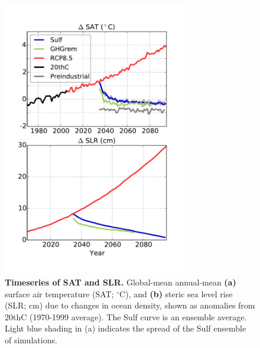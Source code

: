 \documentclass{nature}
\begin{document}
\begin{figure}%
\noindent\includegraphics[width=19pc]{figures/SAT_SLR_timeseries_geotimescalesWAISpaper.pdf} %
\caption{\textbf{Timeseries of SAT and SLR.} Global-mean annual-mean \textbf{(a)} surface air temperature (SAT; $^\circ$C), and \textbf{(b)} steric sea level rise (SLR; cm) due to changes in ocean density, shown as anomalies from 20thC (1970-1999 average). The Sulf curve is an ensemble average. Light blue shading in (a) indicates the spread of the Sulf ensemble of simulations.}
\label{fig:gmts} %
\end{figure}
\end{document}

